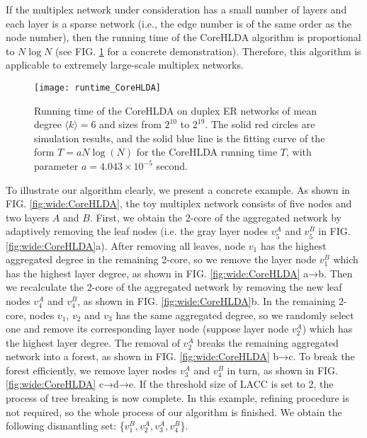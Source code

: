 \documentclass[%
 aip,
 cha,
 amsmath,amssymb,
 reprint,%
]{revtex4-1}
\begin{document}
If the multiplex network under consideration has a small number of layers and each layer is a sparse network (i.e., the edge number is of the same order as the node number), then the running time of the CoreHLDA algorithm is proportional to $N\log N$ (see FIG. \ref{fig:runtime_corehlda} for a concrete demonstration). Therefore, this algorithm is applicable to extremely large-scale multiplex networks.

\begin{figure}
\texttt{[image: runtime\_CoreHLDA]}%
\caption{\label{fig:runtime_corehlda} Running time of the CoreHLDA on duplex ER networks of mean degree $\langle k\rangle = 6$ and sizes from $2^{10}$ to $2^{19}$. The solid red circles are simulation results, and the solid blue line is the fitting curve of the form $T = a N\log(N)$ for the CoreHLDA running time $T$, with parameter $a = 4.043\times 10^{-5}$ second.}
\end{figure}


To illustrate our algorithm clearly, we present a concrete example. As shown in FIG. \ref{fig:wide:CoreHLDA}, the toy multiplex network consists of five nodes and two layers $A$ and $B$. First, we obtain the 2-core of the aggregated network by adaptively removing the leaf nodes (i.e. the gray layer nodes $v_5^A$ and $v_5^B$ in FIG. \ref{fig:wide:CoreHLDA}a). After removing all leaves, node $v_1$ has the highest aggregated degree in the remaining 2-core, so we remove the layer node $v_1^B$ which has the highest layer degree, as shown in FIG. \ref{fig:wide:CoreHLDA} a→b. Then we recalculate the 2-core of the aggregated network by removing the new leaf nodes $v_4^A$ and $v_4^B$, as shown in FIG. \ref{fig:wide:CoreHLDA}b. In the remaining 2-core, nodes $v_1$, $v_2$ and $v_3$ has the same aggregated degree, so we randomly select one and remove its corresponding layer node (suppose layer node $v_2^A$) which has the highest layer degree. The removal of $v_2^A$ breaks the remaining aggregated network into a forest, as shown in FIG. \ref{fig:wide:CoreHLDA} b→c. To break the forest efficiently, we remove layer nodes $v_3^A$ and $v_4^B$ in turn, as shown in FIG. \ref{fig:wide:CoreHLDA} c→d→e. If the threshold size of LACC is set to 2, the process of tree breaking is now complete. In this example, refining procedure is not required, so the whole process of our algorithm is finished. We obtain the following dismantling set: \{$v_1^B,v_2^A,v_3^A,v_4^B$\}.
\end{document}
